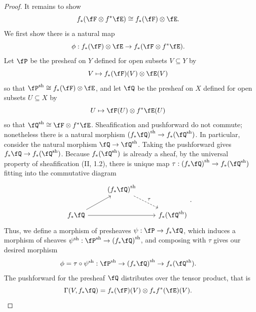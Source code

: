 \documentclass[a4paper]{article}
\begin{document}
\begin{enumerate} [label=\textbf{\arabic*.}, leftmargin=0em]
\begin{proof}
          It remains to show
          \begin{equation*}
            f_*(\fF \otimes f^* \fE) \cong f_*(\fF) \otimes \fE.
          \end{equation*}
          We first show there is a natural map
          \begin{equation*}
            \phi : f_*(\fF) \otimes \fE \to f_*(\fF \otimes f^*\fE).
          \end{equation*}
          Let $\fP$ be the presheaf on $Y$ defined for open subsets $V \subseteq Y$ by
          \begin{equation*}
            V \mapsto f_*(\fF)(V) \otimes \fE(V)
          \end{equation*}
          so that $\sh{\fP} \cong f_*(\fF) \otimes \fE$, and let $\fQ$ be the presheaf on $X$ defined for open subsets $U \subseteq X$ by
          \begin{equation*}
            U \mapsto \fF(U) \otimes f^*\fE(U)
          \end{equation*}
          so that $\sh{\fQ} \cong \fF \otimes f^*\fE$.
          Sheafification and pushforward do not commute; nonetheless there is a natural morphism $\sh{(f_*\fQ)} \to f_*(\sh{\fQ})$.
          In particular, consider the natural morphism $\fQ \to \sh{\fQ}$.
          Taking the pushforward gives $f_*\fQ \to f_*(\sh{\fQ})$.
          Because $f_*(\sh{\fQ})$ is already a sheaf, by the universal property of sheafification (II, 1.2), there is unique map $\tau : \sh{(f_*\fQ)} \to f_*(\sh{\fQ})$ fitting into the commutative diagram
          \[ \begin{tikzcd}
              & \sh{(f_*\fQ)} \arrow["\tau", rd, dashed] &               \\
              f_*\fQ \arrow[rr] \arrow[ru] &                                & f_*(\sh{\fQ})
            \end{tikzcd}. \]
          Thus, we define a morphism of presheaves $\psi : \fP \to f_*\fQ$, which induces a morphism of sheaves $\sh{\psi} : \sh{\fP} \to \sh{(f_*\fQ)}$, and composing with $\tau$ gives our desired morphism
          \begin{equation*}
            \phi = \tau \circ \sh{\psi} : \sh{\fP} \to \sh{(f_*\fQ)} \to f_*(\sh{\fQ}).
          \end{equation*}
          The pushforward for the presheaf $\fQ$ distributes over the tensor product, that is
          \begin{equation*}
            \Gamma(V, f_*\fQ) = f_*(\fF)(V) \otimes f_*f^*(\fE)(V).

\end{equation*}
\end{proof}
\end{enumerate}
\end{document}
